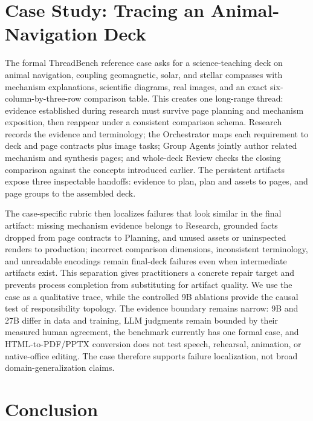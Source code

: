 
\section{Case Study: Tracing an Animal-Navigation Deck}

The formal ThreadBench reference case asks for a science-teaching deck on animal navigation, coupling geomagnetic, solar, and stellar compasses with mechanism explanations, scientific diagrams, real images, and an exact six-column-by-three-row comparison table. This creates one long-range thread: evidence established during research must survive page planning and mechanism exposition, then reappear under a consistent comparison schema. Research records the evidence and terminology; the Orchestrator maps each requirement to deck and page contracts plus image tasks; Group Agents jointly author related mechanism and synthesis pages; and whole-deck Review checks the closing comparison against the concepts introduced earlier. The persistent artifacts expose three inspectable handoffs: evidence to plan, plan and assets to pages, and page groups to the assembled deck.

The case-specific rubric then localizes failures that look similar in the final artifact: missing mechanism evidence belongs to Research, grounded facts dropped from page contracts to Planning, and unused assets or uninspected renders to production; incorrect comparison dimensions, inconsistent terminology, and unreadable encodings remain final-deck failures even when intermediate artifacts exist. This separation gives practitioners a concrete repair target and prevents process completion from substituting for artifact quality. We use the case as a qualitative trace, while the controlled 9B ablations provide the causal test of responsibility topology. The evidence boundary remains narrow: 9B and 27B differ in data and training, LLM judgments remain bounded by their measured human agreement, the benchmark currently has one formal case, and HTML-to-PDF/PPTX conversion does not test speech, rehearsal, animation, or native-office editing. The case therefore supports failure localization, not broad domain-generalization claims.

\section{Conclusion}

